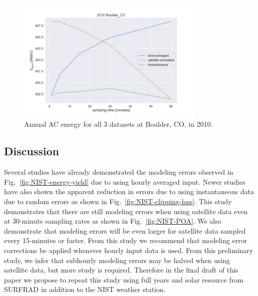 \documentclass[conference]{IEEEtran}
\begin{document}
\begin{figure}[htbp]
\centerline{\includegraphics[width=9cm]{analysis/tbl2010.png}}
\caption{Annual AC energy for all 3 datasets at Boulder, CO, in 2010.}
\label{fig:tbl2010}
\end{figure}

\subsection{Discussion}
Several studies have already demonstrated the modeling errors observed in Fig.~\ref{fig:NIST-energy-yield} due to using hourly averaged input. Newer studies have also shown the apparent reduction in errors due to using instantaneous data due to random errors as shown in Fig.~\ref{fig:NIST-clipping-loss}. This study demonstrates that there are still modeling errors when using satellite data even at 30-minute sampling rates as shown in Fig.~\ref{fig:NIST-POA}. We also demonstrate that modeling errors will be even larger for satellite data sampled every 15-minutes or faster. From this study we recommend that modeling error corrections be applied whenever hourly input data is used. From this preliminary study, we infer that subhourly modeling errors may be halved when using satellite data, but more study is required. Therefore in the final draft of this paper we propose to repeat this study using full years and solar resource from SURFRAD in addition to the NIST weather station.
\end{document}

